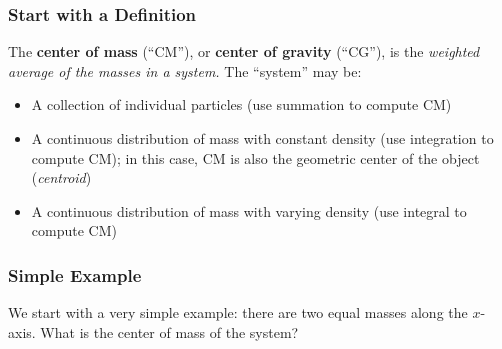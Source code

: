 \documentclass[12pt,compress,aspectratio=169]{beamer}
\begin{document}
\begin{frame}
  \frametitle{Start with a Definition} %
  The \textbf{center of mass} (``CM''), or \textbf{center of gravity} (``CG''),
  is the \emph{weighted average of the masses in a system.} The ``system'' may
  be:
  \begin{itemize}
  \item A collection of individual particles (use summation to compute CM)
  \item A continuous distribution of mass with constant density (use
    integration to compute CM); in this case, CM is also the geometric center
    of the object (\emph{centroid})
  \item A continuous distribution of mass with varying density (use integral to
    compute CM)
  \end{itemize}
\end{frame}


\begin{frame}
  \frametitle{Simple Example}
  We start with a very simple example: there are two equal masses along the
  $x$-axis. What is the center of mass of the system?
    
  \vspace{.25in}
  \begin{center}
  \end{center}
  \vspace{.2in}

\end{frame}
\end{document}
